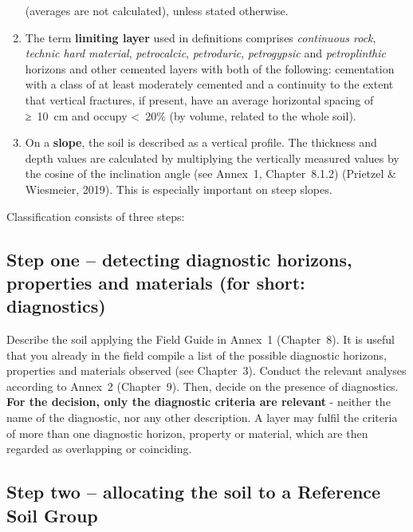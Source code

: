 \documentclass[
  letterpaper,
  DIV=11,
  numbers=noendperiod]{scrreprt}
\begin{document}
\begin{enumerate}
  (averages are not calculated), unless stated otherwise.
\item
  The term \textbf{limiting layer} used in definitions comprises
  \emph{continuous rock}, \emph{technic hard material},
  \emph{petrocalcic}, \emph{petroduric}, \emph{petrogypsic} and
  \emph{petroplinthic} horizons and other cemented layers with both of
  the following: cementation with a class of at least moderately
  cemented and a continuity to the extent that vertical fractures, if
  present, have an average horizontal spacing of ≥~10~cm and occupy
  \textless~20\% (by volume, related to the whole soil).
\item
  On a \textbf{slope}, the soil is described as a vertical profile. The
  thickness and depth values are calculated by multiplying the
  vertically measured values by the cosine of the inclination angle (see
  Annex~1, Chapter~8.1.2) (Prietzel \& Wiesmeier, 2019). This is
  especially important on steep slopes.
\end{enumerate}

Classification consists of three steps:

\hypertarget{step-one-detecting-diagnostic-horizons-properties-and-materials-for-short-diagnostics}{%
\subsection{Step one -- detecting diagnostic horizons, properties and
materials (for short:
diagnostics)}\label{step-one-detecting-diagnostic-horizons-properties-and-materials-for-short-diagnostics}}

Describe the soil applying the Field Guide in Annex~1 (Chapter~8). It is
useful that you already in the field compile a list of the possible
diagnostic horizons, properties and materials observed (see Chapter~3).
Conduct the relevant analyses according to Annex~2 (Chapter~9). Then,
decide on the presence of diagnostics. \textbf{For the decision, only
the diagnostic criteria are relevant} - neither the name of the
diagnostic, nor any other description. A layer may fulfil the criteria
of more than one diagnostic horizon, property or material, which are
then regarded as overlapping or coinciding.

\hypertarget{step-two-allocating-the-soil-to-a-reference-soil-group}{%
\subsection{Step two -- allocating the soil to a Reference Soil
Group}\label{step-two-allocating-the-soil-to-a-reference-soil-group}}
\end{document}
